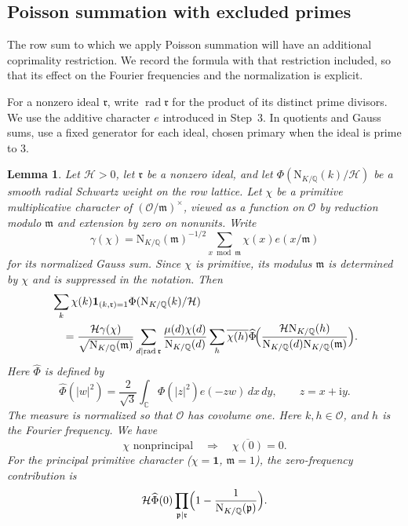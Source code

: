 \documentclass[11pt,a4paper]{article}
\numberwithin{equation}{section}
\numberwithin{figure}{section}
\newtheorem{lemma}[theorem]{Lemma}
\theoremstyle{definition}
\theoremstyle{remark}
\newcommand{\Q}{\mathbb Q}
\newcommand{\NK}{\mathrm N_{K/\Q}}
\newcommand{\OO}{\mathcal O}
\newcommand{\ind}{\mathbf1}
\newcommand{\rad}{\operatorname{rad}}
\begin{document}
\subsection{Poisson summation with excluded primes}
The row sum to which we apply Poisson summation will have an
additional coprimality restriction. We record the formula with that
restriction included, so that its effect on the Fourier frequencies
and the normalization is explicit.

For a nonzero ideal $\mathfrak r$, write $\rad \mathfrak r$ for the product of
its distinct prime divisors. We use the additive character $e$
introduced in Step~3. In quotients and Gauss sums, use a fixed
generator for each ideal, chosen primary when the ideal is prime to $3$.

\begin{lemma}\label{lem:poisson}
Let $\mathcal H>0$, let $\mathfrak r$ be a nonzero ideal, and let
$\Phi(\NK(k)/\mathcal H)$ be a smooth radial Schwartz weight
on the row lattice. Let $\chi$ be a primitive multiplicative character
of $(\OO/\mathfrak m)^\times$, viewed as a function on $\OO$ by
reduction modulo $\mathfrak m$ and extension by zero on nonunits.
Write 
\[
\gamma(\chi)=\NK(\mathfrak m)^{-1/2}
\sum_{x\bmod\mathfrak m}\chi(x)e(x/\mathfrak m)
\]
for its normalized Gauss sum.
Since $\chi$ is primitive, its modulus $\mathfrak m$ is determined by $\chi$ and is suppressed in the notation. Then
\begin{equation}\label{eq:poisson}
 \begin{aligned}
 &\sum_k\chi(k)\ind_{(k,\mathfrak r)=1}\Phi(\NK(k)/\mathcal{H})\\
 &\quad=\frac{\mathcal{H}\gamma(\chi)}{\sqrt{\NK(\mathfrak m)}}
   \sum_{d\mid\rad \mathfrak r}\frac{\mu(d)\chi(d)}{\NK(d)}
   \sum_h\overline{\chi(h)}
        \widehat\Phi\!\Bigl(\frac{\mathcal{H}\NK(h)}{\NK(d)\NK(\mathfrak m)}\Bigr).
 \end{aligned}
\end{equation}
Here $\widehat\Phi$ is defined by
\[
 \widehat\Phi(|w|^2)=\frac2{\sqrt3}\int_{\mathbb C}
       \Phi(|z|^2)e(-zw)\,dx\,dy,\qquad z=x+\mathrm i y.
\]
The measure is normalized so that $\OO$ has covolume one.
Here $k,h\in\OO$, and $h$ is the Fourier frequency. We have
\[
 \chi\text{ nonprincipal}\quad\Longrightarrow\quad
 \overline{\chi(0)}=0.
\]
For the principal primitive character ($\chi=\mathbf1$, $\mathfrak m=1$),
the zero-frequency contribution is
\[
 \mathcal H\widehat\Phi(0)
   \prod_{\mathfrak p\mid \mathfrak r}\Bigl(1-\frac1{\NK(\mathfrak p)}\Bigr).
\]
\end{lemma}
\end{document}
